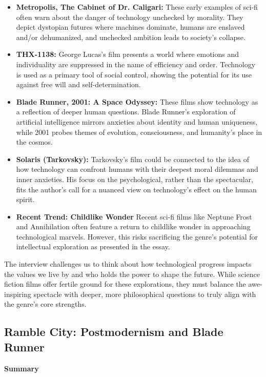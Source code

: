 \documentclass[11pt,fleqn]{book} %
\begin{document}
\begin{itemize}
\item \textbf{Metropolis,  The Cabinet of Dr. Caligari:} These early examples of sci-fi often warn about the danger of technology unchecked by morality. They depict dystopian futures where machines dominate, humans are enslaved and/or dehumanized, and unchecked ambition leads to society's collapse.

\item \textbf{THX-1138:}  George Lucas's film presents a world where emotions and individuality are suppressed in the name of efficiency and order.  Technology is used as a primary tool of social control, showing the potential for its use against free will and self-determination.

\item \textbf{Blade Runner, 2001: A Space Odyssey:} These films show technology as a reflection of deeper human questions.  Blade Runner's exploration of artificial intelligence mirrors anxieties about identity and human uniqueness, while 2001 probes themes of evolution, consciousness, and humanity's place in the cosmos. 

\item \textbf{Solaris (Tarkovsky):}  Tarkovsky's film could be connected to the idea of how technology can confront humans with their deepest moral dilemmas and inner anxieties.  His focus on the psychological, rather than the spectacular, fits the author's call for a nuanced view on technology's effect on the human spirit.  

\item \textbf{Recent Trend: Childlike Wonder} Recent sci-fi films like Neptune Frost and Annihilation often feature a return to childlike wonder in approaching technological marvels. However, this risks sacrificing the genre's potential for intellectual exploration as presented in the essay. 
\end{itemize}

\vspace{5pt}

The interview challenges us to think about how technological progress impacts the values we live by and who holds the power to shape the future.  While science fiction films offer fertile ground for these explorations, they must balance the awe-inspiring spectacle with deeper, more philosophical questions to truly align with the genre's core strengths. 


\subsection{Ramble City: Postmodernism and Blade Runner}
\textbf{Summary}
\end{document}
